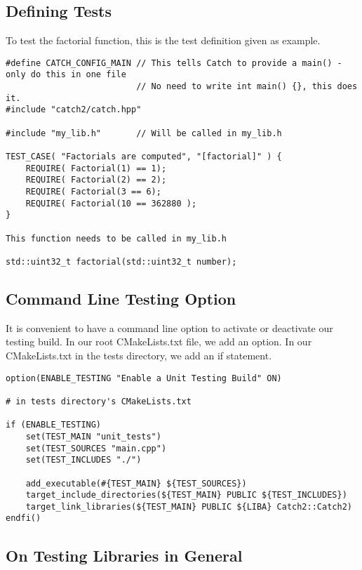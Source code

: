 \subsection{Defining Tests}

To test the factorial function, this is the test definition given as example.

\begin{verbatim}
#define CATCH_CONFIG_MAIN // This tells Catch to provide a main() - only do this in one file
                          // No need to write int main() {}, this does it. 
#include "catch2/catch.hpp"

#include "my_lib.h"       // Will be called in my_lib.h

TEST_CASE( "Factorials are computed", "[factorial]" ) {
    REQUIRE( Factorial(1) == 1);
    REQUIRE( Factorial(2) == 2);
    REQUIRE( Factorial(3 == 6);
    REQUIRE( Factorial(10 == 362880 );
}

This function needs to be called in my_lib.h

std::uint32_t factorial(std::uint32_t number);
\end{verbatim}


\subsection{Command Line Testing Option}

It is convenient to have a command line option to activate or deactivate our testing build. In our root CMakeLists.txt
file, we add an option. In our CMakeLists.txt in the tests directory, we add an if statement. 

\begin{verbatim}
option(ENABLE_TESTING "Enable a Unit Testing Build" ON) 

# in tests directory's CMakeLists.txt

if (ENABLE_TESTING)
    set(TEST_MAIN "unit_tests")
    set(TEST_SOURCES "main.cpp")
    set(TEST_INCLUDES "./")

    add_executable(#{TEST_MAIN} ${TEST_SOURCES})
    target_include_directories(${TEST_MAIN} PUBLIC ${TEST_INCLUDES})
    target_link_libraries(${TEST_MAIN} PUBLIC ${LIBA} Catch2::Catch2)
endfi()
\end{verbatim}


\subsection{On Testing Libraries in General}

